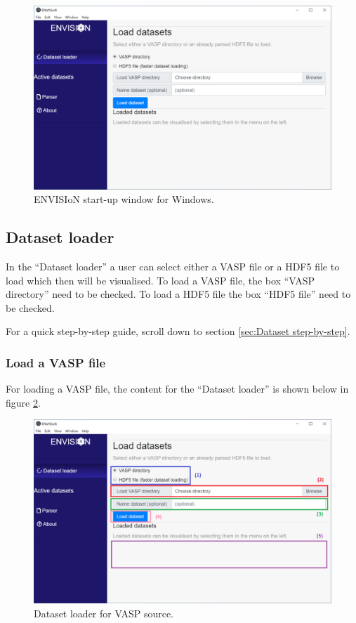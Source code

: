 \begin{figure}[H]
    \centering
    \includegraphics[scale = 0.4]{images/GUI_start_Windows.png}
    \caption{ENVISIoN start-up window for Windows.}
    \label{fig:GUIStartupUbuntu}
\end{figure}

\subsection{Dataset loader}
In the ``Dataset loader'' a user can select either a VASP file or a HDF5 file to load which then will be visualised. To load a VASP file, the box ``VASP directory'' need to be checked. To load a HDF5 file the box ``HDF5 file'' need to be checked. 

For a quick step-by-step guide, scroll down to section \ref{sec:Dataset step-by-step}.

\subsubsection{Load a VASP file}
For loading a VASP file, the content for the ``Dataset loader'' is shown below in figure \ref{fig:GUIDatasetloaderVASP}.

\begin{figure}[H]
    \centering
    \includegraphics[scale = 0.45]{images/GUI_Datasetloader_VASP.png}
    \caption{Dataset loader for VASP source.}
    \label{fig:GUIDatasetloaderVASP}
\end{figure}

